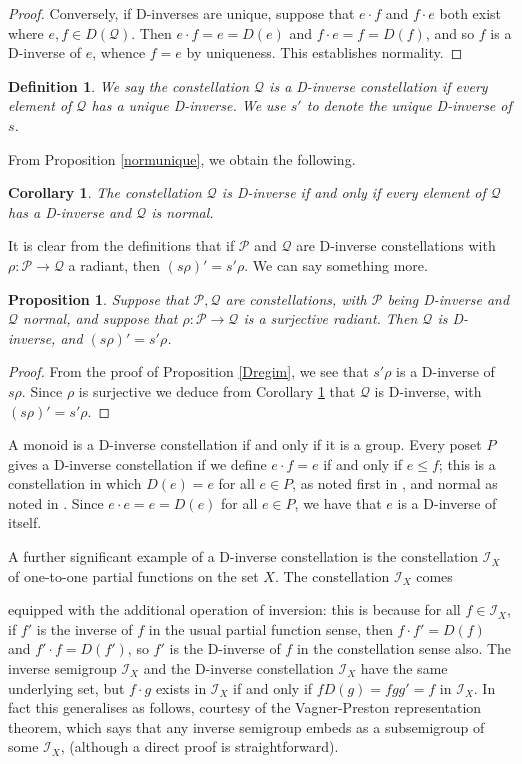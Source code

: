 \documentclass[12pt]{amsart}
\newtheorem{pro}[thm]{Proposition}
\newtheorem{cor}[thm]{Corollary}
\newtheorem{dfn}[thm]{Definition}
\theoremstyle{definition}
\newcommand{\Pcon}{\mathcal P}
\newcommand{\Q}{\mathcal Q}
\newcommand{\I}{\mathcal I}
\begin{document}
{\begin{proof}
Conversely, if D-inverses are unique, suppose that $e\cdot f$ and $f\cdot e$ both exist where $e,f\in D(\Q)$.  Then $e\cdot f=e=D(e)$ and $f\cdot e=f=D(f)$, and so $f$ is a D-inverse of $e$, whence $f=e$ by uniqueness.  This establishes normality.
\end{proof}

\begin{dfn}
We say the constellation $\Q$ is a {\em D-inverse constellation} if every element of $\Q$ has a unique D-inverse.  We use $s'$ to denote the unique D-inverse of $s$. 
\end{dfn}  

From Proposition \ref{normunique}, we obtain the following.

\begin{cor}  \label{corDinv}
The constellation $\Q$ is D-inverse if and only if every element of $\Q$ has a D-inverse and $\Q$ is normal.
\end{cor}

It is clear from the definitions that if  $\Pcon$ and $\Q$ are D-inverse constellations with $\rho: \Pcon\rightarrow \Q$ a radiant, then $(s\rho)'=s'\rho$. We can say something more.


\begin{pro}  \label{Dregim2}
Suppose that $\Pcon,\Q$ are constellations, with $\Pcon$ being D-inverse and $\Q$ normal, and suppose that  $\rho: \Pcon\rightarrow \Q$ is  a surjective radiant. Then $\Q$ is D-inverse, and $(s\rho)'=s'\rho$.
\end{pro}
\begin{proof}
From the proof of Proposition \ref{Dregim}, we see that $s'\rho$ is a D-inverse of $s\rho$. Since $\rho$ is surjective we deduce from  Corollary \ref{corDinv} that $\Q$ is D-inverse, with  $(s\rho)'=s'\rho$.
\end{proof}


A monoid is a D-inverse constellation if and only if it is a group.  Every poset $P$ gives a D-inverse constellation if we define $e\cdot f=e$ if and only if $e\leq f$; this is a constellation in which $D(e)=e$ for all $e\in P$, as noted first in \cite{constell}, and normal as noted in \cite{constgen}.  Since $e\cdot e=e=D(e)$ for all $e\in P$, we have that $e$ is a D-inverse of itself.

A further significant example of a D-inverse constellation is the constellation $\I_X$ of one-to-one partial functions on the set $X$. The constellation $\I_X$ comes }equipped with the additional operation of inversion: this is because for all $f\in \I_X$, if $f'$ is the inverse of $f$ in the usual partial function sense, then $f\cdot f'=D(f)$ and $f'\cdot f=D(f')$, so $f'$ is the D-inverse of $f$ in the constellation sense also. The  inverse semigroup $\mathscr{I}_X$ and the D-inverse constellation $\I_X$ have the same underlying set,  but  $f\cdot g$ exists in $\I_X$ if and only if $fD(g)=fgg'=f$ in $\mathscr{I}_X$.  In fact this generalises as follows, courtesy of the Vagner-Preston representation theorem, which says that any inverse semigroup embeds as a subsemigroup of some $\mathscr{I}_X$, (although a direct proof is straightforward).
\end{document}

